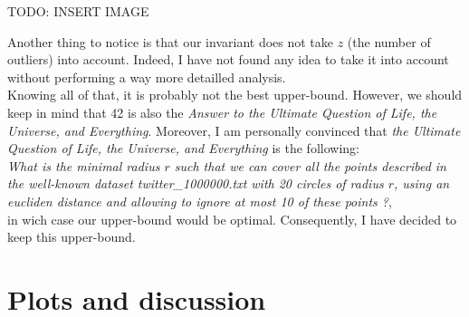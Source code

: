\documentclass[a4paper]{article}%
\begin{document}
	TODO: INSERT IMAGE

	Another thing to notice is that our invariant does not take $z$ (the number of outliers) into account.
	Indeed, I have not found any idea to take it into account without performing a way more detailled analysis.\\

	Knowing all of that, it is probably not the best upper-bound.
	However, we should keep in mind that 42 is also the \textit{Answer to the Ultimate Question of Life, the Universe, and Everything}.
	Moreover, I am personally convinced that \textit{the Ultimate Question of Life, the Universe, and Everything} is the following:\\
	\textit{What is the minimal radius $r$ such that we can cover all the points described in the well-known dataset twitter\_1000000.txt with
	20 circles of radius $r$, using an eucliden distance and allowing to ignore at most 10 of these points ?},\\
	in wich case our upper-bound would be optimal.
	Consequently, I have decided to keep this upper-bound.


	\section{Plots and discussion}
\end{document}
